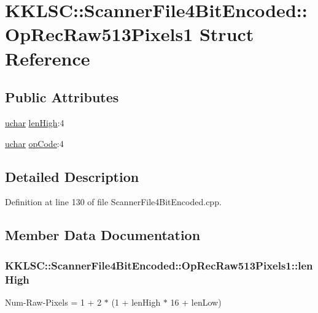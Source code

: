 \hypertarget{struct_scanner_file4_bit_encoded_1_1_op_rec_raw513_pixels1}{}\section{K\+K\+L\+SC\+:\+:Scanner\+File4\+Bit\+Encoded\+:\+:Op\+Rec\+Raw513\+Pixels1 Struct Reference}
\label{struct_scanner_file4_bit_encoded_1_1_op_rec_raw513_pixels1}
\subsection*{Public Attributes}
\begin{DoxyCompactItemize}
\item 
\hyperlink{namespace_k_k_b_ace9969169bf514f9ee6185186949cdf7}{uchar} \hyperlink{struct_scanner_file4_bit_encoded_1_1_op_rec_raw513_pixels1_a569cbc3766fc73cb86d4ceb712473535}{len\+High}\+:4
\item 
\hyperlink{namespace_k_k_b_ace9969169bf514f9ee6185186949cdf7}{uchar} \hyperlink{struct_scanner_file4_bit_encoded_1_1_op_rec_raw513_pixels1_a43ab3168471e51398cecd73dd08118d4}{op\+Code}\+:4
\end{DoxyCompactItemize}


\subsection{Detailed Description}


Definition at line 130 of file Scanner\+File4\+Bit\+Encoded.\+cpp.



\subsection{Member Data Documentation}
\subsubsection[{\texorpdfstring{len\+High}{lenHigh}}]{ K\+K\+L\+S\+C\+::\+Scanner\+File4\+Bit\+Encoded\+::\+Op\+Rec\+Raw513\+Pixels1\+::len\+High}\hypertarget{struct_scanner_file4_bit_encoded_1_1_op_rec_raw513_pixels1_a569cbc3766fc73cb86d4ceb712473535}{}\label{struct_scanner_file4_bit_encoded_1_1_op_rec_raw513_pixels1_a569cbc3766fc73cb86d4ceb712473535}
Num-\/\+Raw-\/\+Pixels = 1 + 2 $\ast$ (1 + len\+High $\ast$ 16 + len\+Low) 

